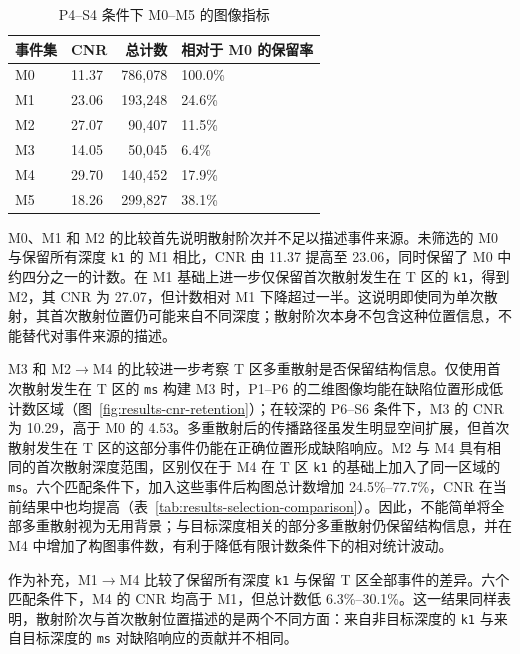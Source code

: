 \begin{table}[H]
  \centering
  \small
  \caption{P4--S4 条件下 M0--M5 的图像指标}
  \label{tab:results-image-metrics}
  \begin{tabularx}{\textwidth}{@{}l X r X@{}}
    \toprule
    \textbf{事件集} & \textbf{CNR} & \textbf{总计数} & \textbf{相对于 M0 的保留率} \\
    \midrule
    M0 & 11.37 & 786,078 & 100.0\% \\
    M1 & 23.06 & 193,248 & 24.6\% \\
    M2 & 27.07 & 90,407 & 11.5\% \\
    M3 & 14.05 & 50,045 & 6.4\% \\
    M4 & 29.70 & 140,452 & 17.9\% \\
    M5 & 18.26 & 299,827 & 38.1\% \\
    \bottomrule
  \end{tabularx}
\end{table}


M0、M1 和 M2 的比较首先说明散射阶次并不足以描述事件来源。未筛选的 M0 与保留所有深度 \texttt{k1} 的 M1 相比，CNR 由 11.37 提高至 23.06，同时保留了 M0 中约四分之一的计数。在 M1 基础上进一步仅保留首次散射发生在 T 区的 \texttt{k1}，得到 M2，其 CNR 为 27.07，但计数相对 M1 下降超过一半。这说明即使同为单次散射，其首次散射位置仍可能来自不同深度；散射阶次本身不包含这种位置信息，不能替代对事件来源的描述。

M3 和 M2$\rightarrow$M4 的比较进一步考察 T 区多重散射是否保留结构信息。仅使用首次散射发生在 T 区的 \texttt{ms} 构建 M3 时，P1--P6 的二维图像均能在缺陷位置形成低计数区域（图~\ref{fig:results-cnr-retention}）；在较深的 P6--S6 条件下，M3 的 CNR 为 10.29，高于 M0 的 4.53。多重散射后的传播路径虽发生明显空间扩展，但首次散射发生在 T 区的这部分事件仍能在正确位置形成缺陷响应。M2 与 M4 具有相同的首次散射深度范围，区别仅在于 M4 在 T 区 \texttt{k1} 的基础上加入了同一区域的 \texttt{ms}。六个匹配条件下，加入这些事件后构图总计数增加 24.5\%--77.7\%，CNR 在当前结果中也均提高（表~\ref{tab:results-selection-comparison}）。因此，不能简单将全部多重散射视为无用背景；与目标深度相关的部分多重散射仍保留结构信息，并在 M4 中增加了构图事件数，有利于降低有限计数条件下的相对统计波动。

作为补充，M1$\rightarrow$M4 比较了保留所有深度 \texttt{k1} 与保留 T 区全部事件的差异。六个匹配条件下，M4 的 CNR 均高于 M1，但总计数低 6.3\%--30.1\%。这一结果同样表明，散射阶次与首次散射位置描述的是两个不同方面：来自非目标深度的 \texttt{k1} 与来自目标深度的 \texttt{ms} 对缺陷响应的贡献并不相同。

